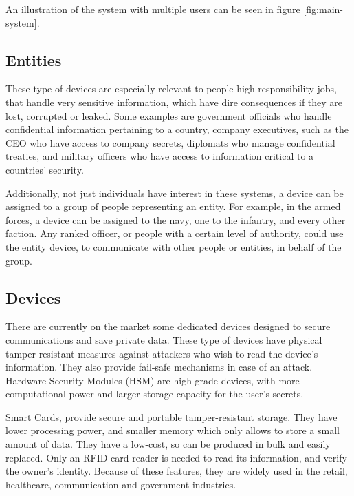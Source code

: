 An illustration of the system with multiple users can be seen in figure \ref{fig:main-system}.

\subsection{Entities} \label{chap:problem:entities}

These type of devices are especially relevant to people high responsibility jobs, that handle very sensitive information, which have dire consequences if they are lost, corrupted or leaked.
Some examples are government officials who handle confidential information pertaining to a country, company executives, such as the CEO who have access to company secrets, diplomats who manage confidential treaties, and military officers who have access to information critical to a countries' security.

Additionally, not just individuals have interest in these systems, a device can be assigned to a group of people representing an entity. For example, in the armed forces, a device can be assigned to the navy, one to the infantry, and every other faction. Any ranked officer, or people with a certain level of authority, could use the entity device, to communicate with other people or entities, in behalf of the group.

\subsection{Devices} \label{chap:problem:devices}
There are currently on the market some dedicated devices designed to secure communications and save private data.
These type of devices have physical tamper-resistant measures against attackers who wish to read the device's information. They also provide fail-safe mechanisms in case of an attack.
Hardware Security Modules (HSM) are high grade devices, with more computational power and larger storage capacity for the user's secrets.

Smart Cards, provide secure and portable tamper-resistant storage.
They have lower processing power, and smaller memory which only allows to store a small amount of data.
They have a low-cost, so can be produced in bulk and easily replaced. Only an RFID card reader is needed to read its information, and verify the owner's identity.
Because of these features, they are widely used in the retail, healthcare, communication and government industries.


